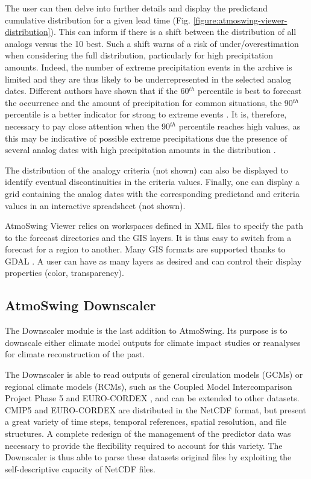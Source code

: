 \documentclass[gmd]{copernicus}
\begin{document}
The user can then delve into further details and display the predictand cumulative distribution for a given lead time (Fig. \ref{figure:atmoswing-viewer-distribution}). This can inform if there is a shift between the distribution of all analogs versus the 10 best. Such a shift warns of a risk of under/overestimation when considering the full distribution, particularly for high precipitation amounts. Indeed, the number of extreme precipitation events in the archive is limited and they are thus likely to be underrepresented in the selected analog dates. Different authors have shown that if the 60$^{th}$ percentile is best to forecast the occurrence and the amount of precipitation for common situations, the 90$^{th}$ percentile is a better indicator for strong to extreme events \citep{Djerboua2001, Bontron2004, Marty2010}. It is, therefore, necessary to pay close attention when the 90$^{th}$ percentile reaches high values, as this may be indicative of possible extreme precipitations due the presence of several analog dates with high precipitation amounts in the distribution \citep{Djerboua2001}.

The distribution of the analogy criteria (not shown) can also be displayed to identify eventual discontinuities in the criteria values. Finally, one can display a grid containing the analog dates with the corresponding predictand and criteria values in an interactive spreadsheet (not shown). 

AtmoSwing Viewer relies on workspaces defined in XML files to specify the path to the forecast directories and the GIS layers. It is thus easy to switch from a forecast for a region to another. Many GIS formats are supported thanks to GDAL \cite[Geospatial Data Abstraction Library,][]{GDAL2014}. A user can have as many layers as desired and can control their display properties (color, transparency).


\subsection{AtmoSwing Downscaler}
\label{sec:downscaler}

The Downscaler module is the last addition to AtmoSwing. Its purpose is to downscale either climate model outputs for climate impact studies or reanalyses for climate reconstruction of the past. 

The Downscaler is able to read outputs of general circulation models (GCMs) or regional climate models (RCMs), such as the Coupled Model Intercomparison Project Phase 5 \citep[CMIP5,][]{Taylor2012} and EURO-CORDEX \citep{Jacob2014}, and can be extended to other datasets. CMIP5 and EURO-CORDEX are distributed in the NetCDF format, but present a great variety of time steps, temporal references, spatial resolution, and file structures. A complete redesign of the management of the predictor data was necessary to provide the flexibility required to account for this variety. The Downscaler is thus able to parse these datasets original files by exploiting the self-descriptive capacity of NetCDF files. 
\end{document}
